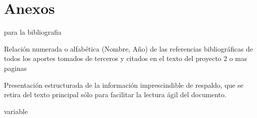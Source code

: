 \chapter{Anexos}


para la bibliografia

Relación numerada o alfabética (Nombre, Año) de
las referencias bibliográficas de todos los aportes
tomados de terceros y citados en el texto del
proyecto 
2 o mas paginas



Presentación estructurada de la información
imprescindible de respaldo, que se retira del texto
principal sólo para facilitar la lectura ágil del
documento. 

variable


